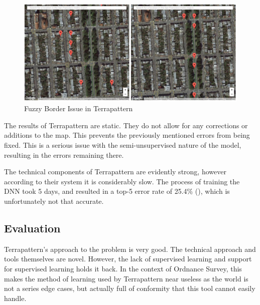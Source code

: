 \begin{figure}[H]
    \centering
    \includegraphics[width=\textwidth]{figs/2/bad_terrapattern}
    \caption{Fuzzy Border Issue in Terrapattern}
    \label{fig:bad_terrapattern}
\end{figure}

The results of Terrapattern are static. They do not allow for any corrections or additions to the map. This prevents the previously mentioned errors from being fixed. This is a serious issue with the semi-unsupervised nature of the model, resulting in the errors remaining there.

The technical components of Terrapattern are evidently strong, however according to their system it is considerably slow. The process of training the DNN took 5 days, and resulted in a top-5 error rate of 25.4\% (\cite{terrapattern:howitworks}), which is unfortunately not that accurate. 

\subsection*{Evaluation}
Terrapattern's approach to the problem is very good. The technical approach and tools themselves are novel. However, the lack of supervised learning and support for supervised learning holds it back. In the context of Ordnance Survey, this makes the method of learning used by Terrapattern near useless as the world is not a series edge cases, but actually full of conformity that this tool cannot easily handle.



